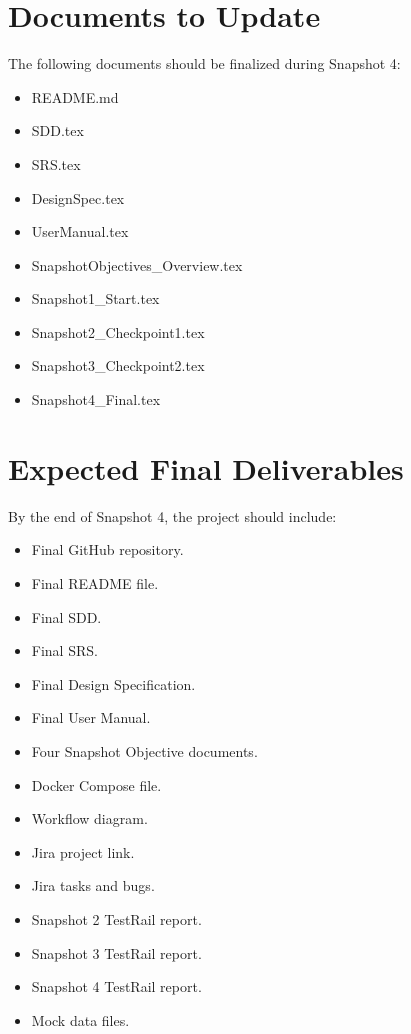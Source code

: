 \documentclass[12pt]{article}
\begin{document}
\section{Documents to Update}

The following documents should be finalized during Snapshot 4:

\begin{itemize}
    \item README.md
    \item SDD.tex
    \item SRS.tex
    \item DesignSpec.tex
    \item UserManual.tex
    \item SnapshotObjectives\_Overview.tex
    \item Snapshot1\_Start.tex
    \item Snapshot2\_Checkpoint1.tex
    \item Snapshot3\_Checkpoint2.tex
    \item Snapshot4\_Final.tex
\end{itemize}

\section{Expected Final Deliverables}

By the end of Snapshot 4, the project should include:

\begin{itemize}
    \item Final GitHub repository.
    \item Final README file.
    \item Final SDD.
    \item Final SRS.
    \item Final Design Specification.
    \item Final User Manual.
    \item Four Snapshot Objective documents.
    \item Docker Compose file.
    \item Workflow diagram.
    \item Jira project link.
    \item Jira tasks and bugs.
    \item Snapshot 2 TestRail report.
    \item Snapshot 3 TestRail report.
    \item Snapshot 4 TestRail report.
    \item Mock data files.
\end{itemize}
\end{document}
